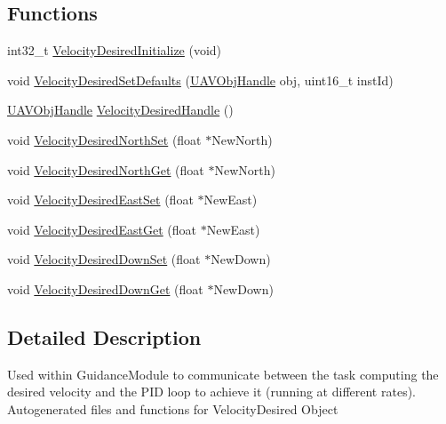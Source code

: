 \subsection*{\-Functions}
\begin{DoxyCompactItemize}
\item 
int32\-\_\-t \hyperlink{group___velocity_desired_ga74612eb6f3df444a7eff1cb5f1664e16}{\-Velocity\-Desired\-Initialize} (void)
\item 
void \hyperlink{group___velocity_desired_ga409ff06857ea07389e2f815721382371}{\-Velocity\-Desired\-Set\-Defaults} (\hyperlink{targets_2_u_a_v_objects_2inc_2uavobjectmanager_8h_a279053e22be53ce9f895043aaeb91e3b}{\-U\-A\-V\-Obj\-Handle} obj, uint16\-\_\-t inst\-Id)
\item 
\hyperlink{targets_2_u_a_v_objects_2inc_2uavobjectmanager_8h_a279053e22be53ce9f895043aaeb91e3b}{\-U\-A\-V\-Obj\-Handle} \hyperlink{group___velocity_desired_ga0733e23def228d38a3e5793f45935120}{\-Velocity\-Desired\-Handle} ()
\item 
void \hyperlink{group___velocity_desired_ga22ace4c236f8f04237bc91c16133f869}{\-Velocity\-Desired\-North\-Set} (float $\ast$\-New\-North)
\item 
void \hyperlink{group___velocity_desired_ga14162f4c8146bb4f5a2e69f6db507460}{\-Velocity\-Desired\-North\-Get} (float $\ast$\-New\-North)
\item 
void \hyperlink{group___velocity_desired_ga610d25a226738adaab9611c9b06f112f}{\-Velocity\-Desired\-East\-Set} (float $\ast$\-New\-East)
\item 
void \hyperlink{group___velocity_desired_ga8d9b3539209f6e90dceae778e94376e1}{\-Velocity\-Desired\-East\-Get} (float $\ast$\-New\-East)
\item 
void \hyperlink{group___velocity_desired_ga6b955cd6b2049647c2e50b2b5ab91642}{\-Velocity\-Desired\-Down\-Set} (float $\ast$\-New\-Down)
\item 
void \hyperlink{group___velocity_desired_ga4ab1f7efa14b9ca2c3a46685009b76cd}{\-Velocity\-Desired\-Down\-Get} (float $\ast$\-New\-Down)
\end{DoxyCompactItemize}


\subsection{\-Detailed \-Description}
\-Used within \-Guidance\-Module to communicate between the task computing the desired velocity and the \-P\-I\-D loop to achieve it (running at different rates). \-Autogenerated files and functions for \-Velocity\-Desired \-Object 


